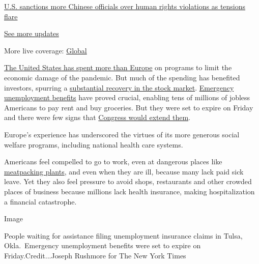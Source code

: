\href{https://www.nytimes.com/live/2020/07/31/business/stock-market-today-coronavirus?action=click\&pgtype=Article\&state=default\&region=MAIN_CONTENT_1\&context=storylines_live_updates\#us-sanctions-more-chinese-officials-over-human-rights-violations-as-tensions-flare}{U.S.
sanctions more Chinese officials over human rights violations as
tensions flare}

\href{https://www.nytimes.com/live/2020/07/31/business/stock-market-today-coronavirus?action=click\&pgtype=Article\&state=default\&region=MAIN_CONTENT_1\&context=storylines_live_updates}{See
more updates}

More live coverage:
\href{https://www.nytimes.com/2020/07/31/world/coronavirus-covid-19.html?action=click\&pgtype=Article\&state=default\&region=MAIN_CONTENT_1\&context=storylines_live_updates}{Global}

\href{https://www.bruegel.org/publications/datasets/covid-national-dataset/}{The
United States has spent more than Europe} on programs to limit the
economic damage of the pandemic. But much of the spending has benefited
investors, spurring a
\href{https://www.nytimes.com/2020/06/08/business/recession-stock-market-coronavirus.html}{substantial
recovery in the stock market}.
\href{https://www.nytimes.com/2020/07/29/business/economy/unemployment-benefits-coronavirus.html}{Emergency
unemployment benefits} have proved crucial, enabling tens of millions of
jobless Americans to pay rent and buy groceries. But they were set to
expire on Friday and there were few signs that
\href{https://www.nytimes.com/2020/07/30/us/politics/senate-virus-aid.html}{Congress
would extend them}.

Europe's experience has underscored the virtues of its more generous
social welfare programs, including national health care systems.

Americans feel compelled to go to work, even at dangerous places like
\href{https://www.nytimes.com/2020/05/10/business/economy/coronavirus-tyson-plant-iowa.html}{meatpacking
plants}, and even when they are ill, because many lack paid sick leave.
Yet they also feel pressure to avoid shops, restaurants and other
crowded places of business because millions lack health insurance,
making hospitalization a financial catastrophe.

Image

People waiting for assistance filing unemployment insurance claims in
Tulsa, Okla.~Emergency unemployment benefits were set to expire on
Friday.Credit...Joseph Rushmore for The New York Times

